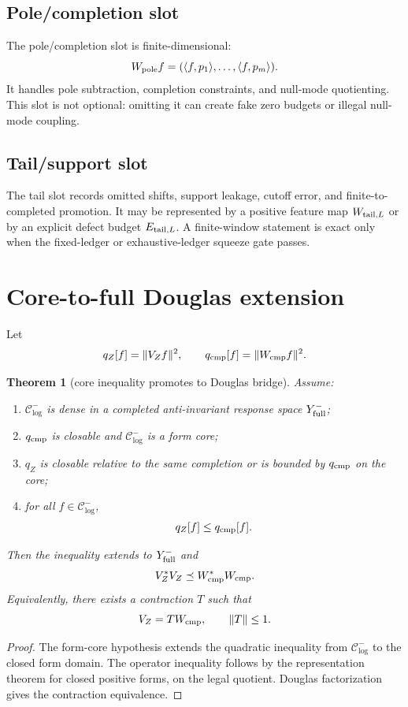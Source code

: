 \documentclass[11pt]{article}
\newtheorem{theorem}{Theorem}
\newcommand{\Wcmp}{W_{\rm cmp}}
\begin{document}
\subsection{Pole/completion slot}
The pole/completion slot is finite-dimensional:
\[
  W_{\rm pole}f=(\langle f,p_1\rangle,\dots,\langle f,p_m\rangle).
\]
It handles pole subtraction, completion constraints, and null-mode quotienting.  This slot is not optional: omitting it can create fake zero budgets or illegal null-mode coupling.

\subsection{Tail/support slot}
The tail slot records omitted shifts, support leakage, cutoff error, and finite-to-completed promotion.  It may be represented by a positive feature map \(W_{{\rm tail},L}\) or by an explicit defect budget \(E_{{\rm tail},L}\).  A finite-window statement is exact only when the fixed-ledger or exhaustive-ledger squeeze gate passes.

\section{Core-to-full Douglas extension}
Let
\[
  q_Z[f]=\|V_Zf\|^2,
  \qquad
  q_{\rm cmp}[f]=\|\Wcmp f\|^2.
\]

\begin{theorem}[core inequality promotes to Douglas bridge]
Assume:
\begin{enumerate}[label=(\roman*)]
\item \(\mathcal C^-_{\log}\) is dense in a completed anti-invariant response space \(Y^-_{\rm full}\);
\item \(q_{\rm cmp}\) is closable and \(\mathcal C^-_{\log}\) is a form core;
\item \(q_Z\) is closable relative to the same completion or is bounded by \(q_{\rm cmp}\) on the core;
\item for all \(f\in\mathcal C^-_{\log}\),
\[
  q_Z[f]\le q_{\rm cmp}[f].
\]
\end{enumerate}
Then the inequality extends to \(Y^-_{\rm full}\) and
\[
  V_Z^*V_Z\preceq \Wcmp^*\Wcmp.
\]
Equivalently, there exists a contraction \(T\) such that
\[
  V_Z=T\Wcmp,
  \qquad \|T\|\le1.
\]
\end{theorem}

\begin{proof}
The form-core hypothesis extends the quadratic inequality from \(\mathcal C^-_{\log}\) to the closed form domain.  The operator inequality follows by the representation theorem for closed positive forms, on the legal quotient.  Douglas factorization gives the contraction equivalence.
\end{proof}
\end{document}

